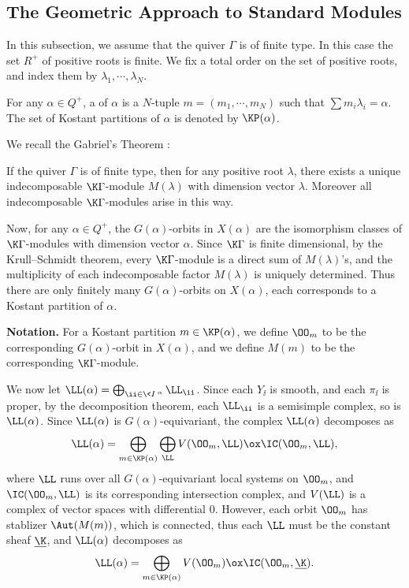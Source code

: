 \subsection{The Geometric Approach to Standard Modules}

In this subsection, we assume that the quiver $\Gamma$ is of finite type.
In this case the set $R^+$ of positive roots is finite. 
We fix a total order on the set of positive roots, and index them by $\lambda_1,\cdots,\lambda_N$.

\begin{definition}
    For any $\alpha\in Q^+$, a  of $\alpha$ is a $N$-tuple
    $m = (m_1,\cdots,m_N)$ such that $\sum m_i\lambda_i = \alpha$.
    The set of Kostant partitions of $\alpha$ is denoted by 
    $\KP(\alpha)$.
\end{definition}

We recall the Gabriel's Theorem \cite{G}:

\begin{theorem}\label{gabriel}
    If the quiver $\Gamma$ is of finite type, then for any 
    positive root $\lambda$, there exists a unique indecomposable
    $\K\Gamma$-module $M(\lambda)$ with dimension vector $\lambda$.
    Moreover all indecomposable $\K\Gamma$-modules arise in this way.
\end{theorem}

Now, for any $\alpha\in Q^+$, the $G(\alpha)$-orbits in $X(\alpha)$ are
the isomorphism classes of $\K\Gamma$-modules with dimension vector
$\alpha$. Since $\K\Gamma$ is finite dimensional, by the
Krull--Schmidt theorem, every $\K\Gamma$-module is a direct
sum of $M(\lambda)$'s, and the multiplicity
of each indecomposable factor $M(\lambda)$ is uniquely determined. 
Thus there are only finitely many $G(\alpha)$-orbits on $X(\alpha)$, each corresponds to
a Kostant partition of $\alpha$. 

\textbf{Notation.} For a Kostant partition $m\in\KP(\alpha)$,
we define $\OO_m$ to be the corresponding $G(\alpha)$-orbit
in $X(\alpha)$, and we define $M(m)$ to be the corresponding
$\K\Gamma$-module.

We now let $\LL(\alpha) = \bigoplus_{\ii\in\<I\>^\alpha}
\LL_{\ii}$. Since each $Y_{\ii}$ is smooth, and each
$\pi_{\ii}$ is proper, by the decomposition theorem, 
each $\LL_{\ii}$ is a semisimple complex, so is 
$\LL(\alpha)$. Since $\LL(\alpha)$ is $G(\alpha)$-equivariant,
the complex $\LL(\alpha)$ decomposes as $$\LL(\alpha) = \bigoplus_{m\in\KP(\alpha)}
\bigoplus_{\LL}V(\OO_m,\LL)\ox\IC(\OO_m,\LL),$$ where $\LL$
runs over all $G(\alpha)$-equivariant local systems on $\OO_m$, and $\IC(\OO_m,\LL)$
is its corresponding intersection complex, and $V(\LL)$
is a complex of vector spaces with differential $0$.
However, each orbit $\OO_m$ has stablizer $\Aut(M(m))$,
which is connected, thus each $\LL$ must be the constant
sheaf $\underline{\K}$, and $\LL(\alpha)$ decomposes as
\[
    \LL(\alpha) = \bigoplus_{m\in\KP(\alpha)}
    V(\OO_m)\ox\IC(\OO_m,\underline{\K}).
\]    

